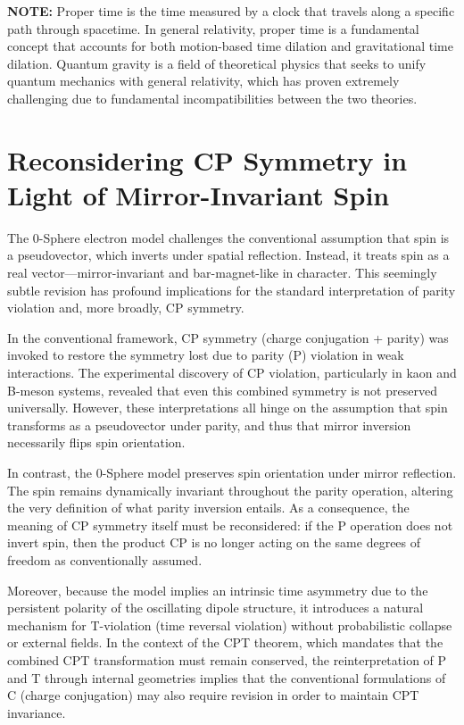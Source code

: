 \documentclass[12pt,letterpaper]{article} %
\begin{document}
\vspace{0.5cm}
\noindent\textbf{NOTE:} Proper time is the time measured by a clock that travels along a specific path through spacetime. In general relativity, proper time is a fundamental concept that accounts for both motion-based time dilation and gravitational time dilation. Quantum gravity is a field of theoretical physics that seeks to unify quantum mechanics with general relativity, which has proven extremely challenging due to fundamental incompatibilities between the two theories.


\section{Reconsidering CP Symmetry in Light of Mirror-Invariant Spin}

The 0-Sphere electron model challenges the conventional assumption that spin is a pseudovector, which inverts under spatial reflection. Instead, it treats spin as a real vector—mirror-invariant and bar-magnet-like in character. This seemingly subtle revision has profound implications for the standard interpretation of parity violation and, more broadly, CP symmetry.

In the conventional framework, CP symmetry (charge conjugation + parity) was invoked to restore the symmetry lost due to parity (P) violation in weak interactions. The experimental discovery of CP violation, particularly in kaon and B-meson systems, revealed that even this combined symmetry is not preserved universally. However, these interpretations all hinge on the assumption that spin transforms as a pseudovector under parity, and thus that mirror inversion necessarily flips spin orientation.

In contrast, the 0-Sphere model preserves spin orientation under mirror reflection. The spin remains dynamically invariant throughout the parity operation, altering the very definition of what parity inversion entails. As a consequence, the meaning of CP symmetry itself must be reconsidered: if the P operation does not invert spin, then the product CP is no longer acting on the same degrees of freedom as conventionally assumed. 

Moreover, because the model implies an intrinsic time asymmetry due to the persistent polarity of the oscillating dipole structure, it introduces a natural mechanism for T-violation (time reversal violation) without probabilistic collapse or external fields. In the context of the CPT theorem, which mandates that the combined CPT transformation must remain conserved, the reinterpretation of P and T through internal geometries implies that the conventional formulations of C (charge conjugation) may also require revision in order to maintain CPT invariance.
\end{document}
